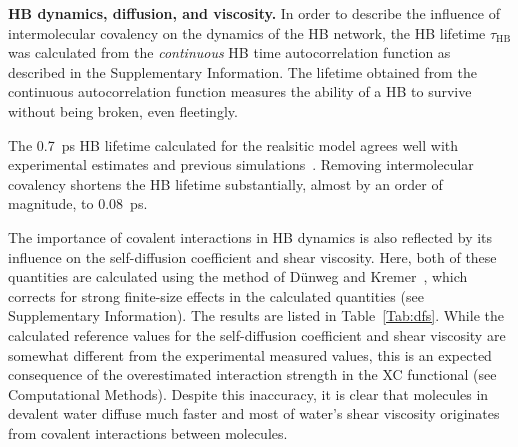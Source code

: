 \documentclass[journal=jacsat,manuscript=article]{achemso}
\newcommand{\old}{\color{black}}
\begin{document}
\textbf{HB dynamics, diffusion, and viscosity.} In order to describe the influence of intermolecular covalency on the dynamics of the HB network, the HB lifetime $\tau_{\text{HB}}$ was calculated from the \emph{continuous} HB time autocorrelation function as described in the Supplementary Information. The lifetime obtained from the continuous autocorrelation function measures the ability of a HB to survive without being broken, even fleetingly.

The 0.7~ps HB lifetime calculated for the realsitic model agrees well with experimental estimates \cite{lawrence2003ultrafast} and previous simulations~\cite{marti1996molecular,starr1999fast}. Removing intermolecular covalency shortens the HB lifetime substantially, almost by an order of magnitude, to 0.08~ps. 


The importance of covalent interactions in HB dynamics is also reflected by its influence on the self-diffusion coefficient and shear viscosity. 
Here, both of these quantities are calculated using the method of D\"unweg and Kremer~\cite{dunweg1993molecular}, which corrects for strong finite-size effects in the calculated quantities (see Supplementary Information). The results are listed in Table~\ref{Tab:dfs}. 
While the calculated reference values for the self-diffusion coefficient and shear viscosity are somewhat different from the experimental measured values, this is an expected consequence of the overestimated interaction strength in the XC functional (see Computational Methods). 
Despite this inaccuracy, it is clear that molecules in devalent water diffuse much faster and most of water's shear viscosity originates from covalent interactions between molecules.
\end{document}
